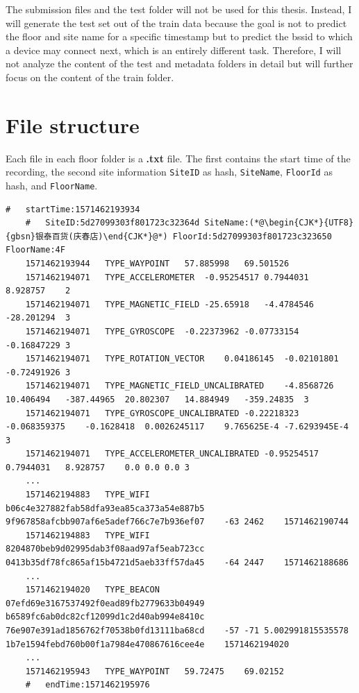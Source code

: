 The submission files and the test folder will not be used for this thesis.
Instead, I will generate the test set out of the train data because the goal is not to predict the floor and site name for a specific timestamp but to predict the \ac{bssid} to which a device may connect next, which is an entirely different task.
Therefore, I will not analyze the content of the test and metadata folders in detail but will further focus on the content of the train folder.


\section{File structure}\label{sec:file-structure}

Each file in each floor folder is a \textbf{.txt} file.
The first contains the start time of the recording, the second site information \texttt{SiteID} as hash, \texttt{SiteName}, \texttt{FloorId} as hash, and \texttt{FloorName}.


\begin{lstlisting}[caption={A snippet from the dataset of the file 5daa9e38df065a00069beb79.txt of the floor F4},label={lst:dataset}]
    #   startTime:1571462193934
    #   SiteID:5d27099303f801723c32364d SiteName:(*@\begin{CJK*}{UTF8}{gbsn}银泰百货(庆春店)\end{CJK*}@*) FloorId:5d27099303f801723c323650 FloorName:4F
    1571462193944   TYPE_WAYPOINT   57.885998   69.501526
    1571462194071   TYPE_ACCELEROMETER  -0.95254517 0.7944031   8.928757    2
    1571462194071   TYPE_MAGNETIC_FIELD -25.65918   -4.4784546  -28.201294  3
    1571462194071   TYPE_GYROSCOPE  -0.22373962 -0.07733154 -0.16847229 3
    1571462194071   TYPE_ROTATION_VECTOR    0.04186145  -0.02101801 -0.72491926 3
    1571462194071   TYPE_MAGNETIC_FIELD_UNCALIBRATED    -4.8568726  10.406494   -387.44965  20.802307   14.884949   -359.24835  3
    1571462194071   TYPE_GYROSCOPE_UNCALIBRATED -0.22218323 -0.068359375    -0.1628418  0.0026245117    9.765625E-4 -7.6293945E-4   3
    1571462194071   TYPE_ACCELEROMETER_UNCALIBRATED -0.95254517 0.7944031   8.928757    0.0 0.0 0.0 3
    ...
    1571462194883   TYPE_WIFI   b06c4e327882fab58dfa93ea85ca373a54e887b5    9f967858afcbb907af6e5adef766c7e7b936ef07    -63 2462    1571462190744
    1571462194883   TYPE_WIFI   8204870beb9d02995dab3f08aad97af5eab723cc    0413b35df78fc865af15b4721d5aeb33ff57da45    -64 2447    1571462188686
    ...
    1571462194020   TYPE_BEACON 07efd69e3167537492f0ead89fb2779633b04949    b6589fc6ab0dc82cf12099d1c2d40ab994e8410c    76e907e391ad1856762f70538b0fd13111ba68cd    -57 -71 5.002991815535578   1b7e1594febd760b00f1a7984e470867616cee4e    1571462194020
    ...
    1571462195943   TYPE_WAYPOINT   59.72475    69.02152
    #   endTime:1571462195976
  \end{lstlisting}

